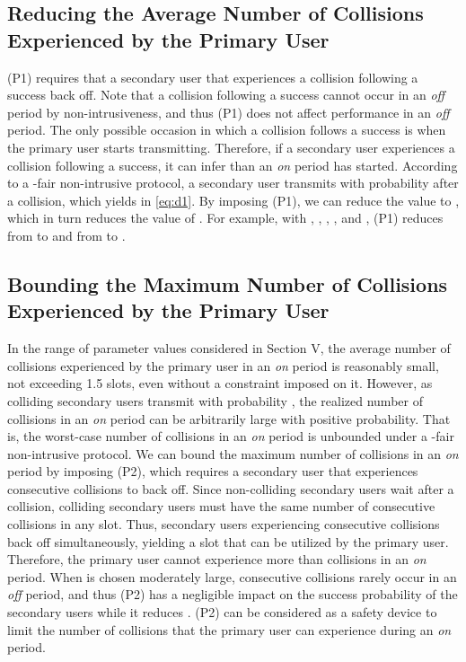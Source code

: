 \documentclass[12pt,draftclsnofoot,onecolumn]{IEEEtran}
\begin{document}
\subsection{Reducing the Average Number of Collisions Experienced by the Primary User}

(P1) requires that a secondary user that experiences a collision following a success back off.
Note that a collision following a success cannot occur in an \emph{off} period by non-intrusiveness,
and thus (P1) does not affect performance in an \emph{off} period.
The only possible occasion in which a collision follows a success is when the
primary user starts transmitting. Therefore, if a secondary user experiences
a collision following a success, it can infer than an \emph{on} period has started.
According to a -fair non-intrusive protocol, a secondary user transmits
with probability  after a collision, which yields  in \eqref{eq:d1}.
By imposing (P1), we can reduce the value to , which in turn
reduces the value of . For example, with , , , ,
and ,
(P1) reduces  from  to  and  from  to .

\subsection{Bounding the Maximum Number of Collisions Experienced by the Primary User}

In the range of parameter values considered in Section V, the average number of
collisions experienced by the primary user in an \emph{on} period is reasonably small,
not exceeding 1.5 slots, even without a constraint imposed on it. However, as colliding secondary users transmit with probability ,
the realized number of collisions in an \emph{on} period can be arbitrarily large
with positive probability. That is, the worst-case number of collisions in an \emph{on} period
is unbounded under a -fair non-intrusive protocol. We can bound the maximum
number of collisions in an \emph{on} period by imposing (P2), which requires
a secondary user that experiences  consecutive collisions to back off.
Since non-colliding secondary users wait after a collision, colliding secondary users must have the same number
of consecutive collisions in any slot. Thus, secondary users experiencing  consecutive collisions
back off simultaneously, yielding a slot that can be utilized by the primary user.
Therefore, the primary user cannot experience more than  collisions
in an \emph{on} period. When  is chosen moderately large,  consecutive collisions
rarely occur in an \emph{off} period, and thus (P2) has a negligible impact on
the success probability of the secondary users  while it reduces .
(P2) can be considered
as a safety device to limit the number of collisions that the primary user
can experience during an \emph{on} period.
\end{document}

